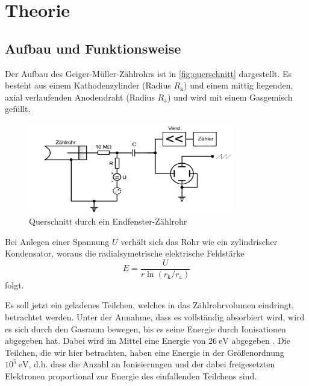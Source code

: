 \section{Theorie}
\label{sec:Theorie}

\subsection{Aufbau und Funktionsweise}
\label{sec:aufbau}

Der Aufbau des Geiger-Müller-Zählrohrs ist in \autoref{fig:querschnitt} dargestellt. Es besteht aus
einem Kathodenzylinder (Radius $R_\text{k}$) und einem mittig liegenden, axial verlaufenden
Anodendraht (Radius $R_\text{a}$) und wird mit einem Gasgemisch gefüllt.
\begin{figure}[H]
	\centering
	\includegraphics[width=0.8\textwidth]{content/aufbau.png}
	\caption{Querschnitt durch ein Endfenster-Zählrohr \cite{sample}}
	\label{fig:querschnitt}
\end{figure}
\noindent
Bei Anlegen einer Spannung $U$ verhält sich das Rohr wie ein zylindrischer Kondensator, woraus die 
radialsymetrische elektrische Feldstärke
\begin{equation}
	E = \frac{U}{r \ln(r_\text{k} / r_\text{a})}
	\label{eqn:elektrisches-feld}
\end{equation}
folgt.

\noindent
Es soll jetzt ein geladenes Teilchen, welches in das Zählrohrvolumen eindringt, betrachtet werden. Unter
der Annahme, dass es vollständig absorbiert wird, wird es sich durch den Gasraum bewegen, bis es seine 
Energie durch Ionisationen abgegeben hat. Dabei wird im Mittel eine Energie von $26\ \si{\eV}$ 
abgegeben \cite{detektoren}.
Die Teilchen, die wir hier betrachten, haben eine Energie in der Größenordnung $10^5\ \si{\eV}$, d.h. 
dass die Anzahl an Ionisierungen und der dabei freigesetzten Elektronen proportional zur Energie des 
einfallenden Teilchens sind.

